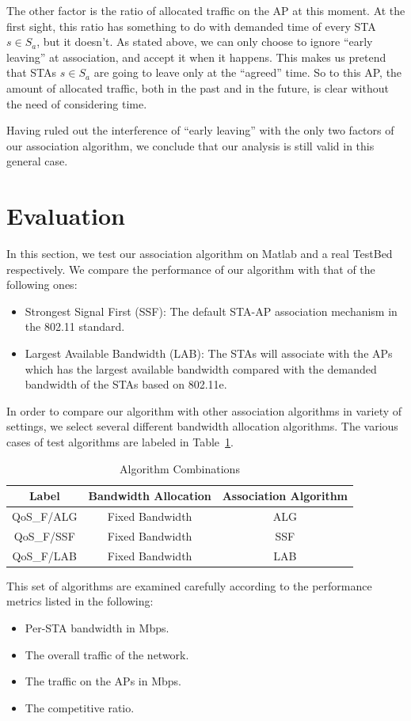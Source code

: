 \documentclass[conference]{IEEEtran}
\begin{document}
  The other factor is the ratio of allocated traffic on the AP at this moment. At the first sight, this ratio has something to do with demanded time of every STA $s\in S_a$, but it doesn't. As stated above, we can only choose to ignore ``early leaving'' at association, and accept it when it happens. This makes us pretend that STAs $s\in S_a$ are going to leave only at the ``agreed'' time. So to this AP, the amount of allocated traffic, both in the past and in the future, is clear without the need of considering time.

  Having ruled out the interference of ``early leaving'' with the only two factors of our association algorithm, we conclude that our analysis is still valid in this general case.

  \section{Evaluation}\label{sec:evaluation}
  In this section, we test our association algorithm on Matlab and a real TestBed respectively.  We compare the performance of our algorithm with that of the following ones:
  \begin{itemize}
    \item Strongest Signal First (SSF): The default STA-AP association mechanism in the 802.11 standard.
    \item Largest Available Bandwidth (LAB): The STAs will associate with the APs which has the largest available bandwidth compared with the demanded bandwidth of the STAs based on 802.11e.
  \end{itemize}

  In order to compare our algorithm with other association algorithms in variety of settings, we select several different bandwidth allocation algorithms. The various cases of test algorithms are labeled in Table~\ref{tl:algorithm_combinations}.

  \begin{table}[!ht]
  \centering
  \caption{Algorithm Combinations}\label{tl:algorithm_combinations}
  \begin{tabular}{|c|c|c|}
    \hline
    Label & Bandwidth Allocation & Association Algorithm \\
    \hline
    QoS\_F/ALG & Fixed Bandwidth & ALG\\
    \hline
    QoS\_F/SSF & Fixed Bandwidth & SSF\\
    \hline
    QoS\_F/LAB & Fixed Bandwidth & LAB\\
    \hline
  \end{tabular}

  \end{table}
  This set of algorithms are examined carefully according to the performance metrics listed in the following:
  \begin{itemize}
    \item Per-STA bandwidth in Mbps.
    \item The overall traffic of the network.
    \item The traffic on the APs in Mbps.
    \item The competitive ratio.
  \end{itemize}
\end{document}
